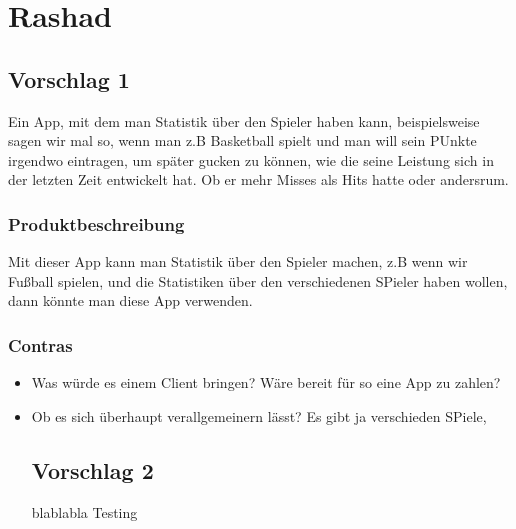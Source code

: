 \section{Rashad}

\subsection{Vorschlag 1}
Ein App, mit dem man Statistik über den Spieler haben kann, beispielsweise sagen wir mal so, wenn man z.B Basketball spielt und man will sein PUnkte irgendwo eintragen, um später gucken zu können, wie die seine Leistung sich in der letzten Zeit entwickelt hat. Ob er mehr Misses als Hits hatte oder andersrum. 


\subsubsection{Produktbeschreibung}
Mit dieser App kann man Statistik über den Spieler machen, z.B wenn wir Fußball spielen, und die Statistiken über den verschiedenen SPieler haben wollen, dann könnte man diese App verwenden. 

\vspace{0.2cm}

\subsubsection{Contras}
\begin{itemize}
\item Was würde es einem Client bringen? Wäre bereit für so eine App zu zahlen?
\item Ob es sich überhaupt verallgemeinern lässt? Es gibt ja verschieden SPiele, 

\subsection{Vorschlag 2}
blablabla Testing

\end{itemize}